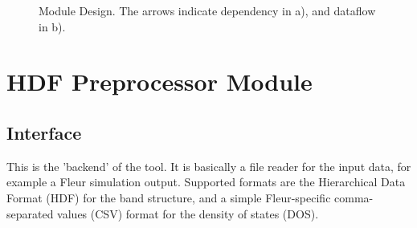 \begin{figure}[htb!]
    \centering
    \hspace{5em}%
    \caption[Module Design.]{Module Design. The arrows indicate dependency in
      a), and dataflow in b).}
    \label{fig:module-design}
\end{figure}


\section{HDF Preprocessor Module}
\label{sec:preprocessor-module}

\subsection{Interface}
\label{sec:preprocessor-interface}

This is the 'backend' of the tool. It is basically a file reader for the input
data, for example a Fleur simulation output. Supported formats are the
Hierarchical Data Format (HDF) \cite{hdf} for the band structure, and a simple
Fleur-specific comma-separated values (CSV) format for the density of states
(DOS).

